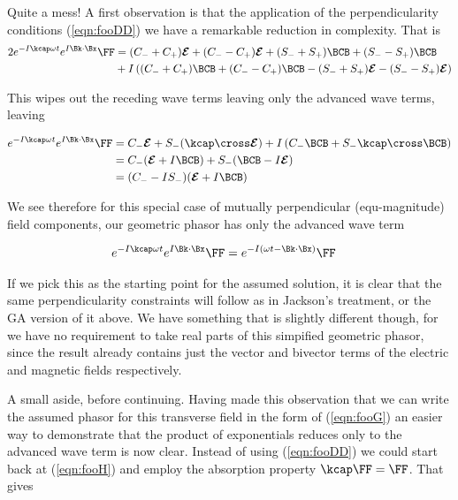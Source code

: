 Quite a mess!  A first observation is that the application of the perpendicularity conditions (\ref{eqn:fooDD}) we have a remarkable reduction in complexity.  That is
\begin{align*}
2 e^{ -I \kcap \omega t } e^{ I \Bk \cdot \Bx } \FF
&=
 (C_{-} + C_{+}) \EE 
+(C_{-} - C_{+}) \EE
+(S_{-} + S_{+}) \BCB
+(S_{-} - S_{+}) \BCB
\\
&+{I}
\left( 
 (C_{-} + C_{+}) \BCB
+(C_{-} - C_{+}) \BCB
-(S_{-} + S_{+}) \EE
-(S_{-} - S_{+}) \EE 
\right) \\
\end{align*}

This wipes out the receding wave terms leaving only the advanced wave terms, leaving

\begin{align*}
e^{ -I \kcap \omega t } e^{ I \Bk \cdot \Bx } \FF
&=
 C_{-} \EE 
+S_{-} (\kcap \cross \EE)
+{I}
\left( 
 C_{-} \BCB +S_{-} \kcap \cross \BCB 
\right) \\
&=
 C_{-} (\EE + I\BCB)
+S_{-} (\BCB -I\EE) \\
&=
( C_{-} -I S_{-} ) (\EE + I\BCB) \\
\end{align*}

We see therefore for this special case of mutually perpendicular (equ-magnitude) field components, our geometric phasor has only the advanced wave term

\begin{align}\label{eqn:fooG}
e^{ -I \kcap \omega t } e^{ I \Bk \cdot \Bx } \FF &= e^{-I(\omega t - \Bk \cdot \Bx)} \FF
\end{align}

If we pick this as the starting point for the assumed solution, it is clear that the same perpendicularity constraints will follow as in Jackson's treatment, or the GA version of it above.  We have something that is slightly different though, for we have no requirement to take real parts of this simpified geometric phasor, since the result already contains just the vector and bivector terms of the electric and magnetic fields respectively.

A small aside, before continuing.  Having made this observation that we can write the assumed phasor for this transverse field in the form of (\ref{eqn:fooG}) an easier way to demonstrate that the product of exponentials reduces only to the advanced wave term is now clear.  Instead of using (\ref{eqn:fooDD}) we could start back at (\ref{eqn:fooH}) and employ the absorption property $\kcap \FF = \FF$.  That gives

